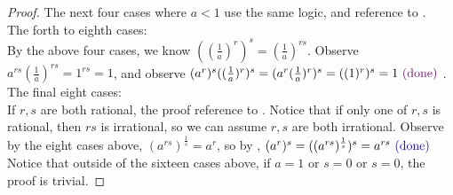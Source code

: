 \documentclass{report}
\begin{document}
\begin{proof}
The next four cases where $a<1$ use the same logic, and  reference to .\\

The forth to eighth cases:  \\

By the above four cases, we know $((\frac{1}{a})^r)^s=(\frac{1}{a})^{rs}$. Observe $a^{rs}(\frac{1}{a})^{rs}=1^{rs}=1$, and observe $(a^r)^s((\frac{1}{a})^r)^s=(a^r(\frac{1}{a})^r)^s=((1)^r)^s=1\textcolor{violet}{\text{ (done) }}$.\\

The final eight cases:  \\

If $r,s$ are both rational, the proof reference to . Notice that if only one of $r,s$ is rational, then  $rs$ is irrational, so we can assume  $r,s$ are both irrational. Observe by the eight cases above, $(a^{rs})^{\frac{1}{s}}=a^r$, so by , $(a^r)^s=((a^{rs})^{\frac{1}{s}})^s=a^{rs}\textcolor{blue}{\text{ (done) }}$\\

Notice that outside of the sixteen cases above, if $a=1\text{ or }s=0\text{ or }s=0$, the proof is trivial.

\end{proof}
\end{document}
